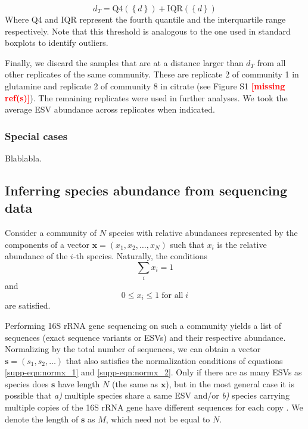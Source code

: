 \documentclass[a4paper,10pt]{article}
\newcommand{\mr}{\textcolor{red}{\textbf{[missing ref(s)]}}}
\begin{document}
\begin{equation}
d_T = \mathrm{Q}4 \left( \left\{d\right\} \right) + 
\mathrm{IQR} \left( \left\{d\right\} \right)
\label{supp-eqn:threshold}
\end{equation}
%
Where Q4 and IQR represent the fourth quantile and the interquartile range
respectively. Note that this threshold is analogous to the one used in
standard boxplots to identify outliers.

Finally, we discard the samples that are at a distance larger than $d_T$ from
all other replicates of the same community. These are replicate 2 of community
1 in glutamine and replicate 2 of community 8 in citrate (see Figure S1 \mr).
The remaining replicates were used in further analyses. We took the average
ESV abundance across replicates when indicated.

\subsubsection{Special cases}\label{supp-methods:data-proc:special}

Blablabla.

\subsection{Inferring species abundance from sequencing data}
\label{supp-methods:species-from-seq}

Consider a community of $N$ species with relative abundances represented
by the components of a vector $\mathbf{x} = \left( x_1, x_2, \dotsc,
x_N\right)$ such that $x_i$ is the relative abundance of the $i$-th species.
Naturally, the conditions
%
\begin{equation}
\sum_i x_i = 1
\label{supp-eqn:normx_1}
\end{equation}
%
and
%
\begin{equation}
0 \leq x_i \leq 1 \; \textrm{for all} \; i
\label{supp-eqn:normx_2}
\end{equation}
%
are satisfied.

Performing 16S rRNA gene sequencing on such a community yields a list of
sequences (exact sequence variants or ESVs) and their respective abundance.
Normalizing by the total number of sequences, we can obtain a vector $\mathbf{s}
= \left( s_1, s_2, \dotsc \right)$ that also satisfies the normalization
conditions of equations \ref{supp-eqn:normx_1} and \ref{supp-eqn:normx_2}.
Only if there are as many ESVs as species does $\mathbf{s}$ have length $N$
(the same as $\mathbf{x}$), but in the most general case it is possible that
\textit{a)} multiple species share a same ESV and/or \textit{b)} species carrying
multiple copies
of the 16S rRNA gene have different sequences for each copy \cite{Vetrovsky2013}. We denote
the length of $\mathbf{s}$ as $M$, which need not be equal to $N$.
\end{document}
